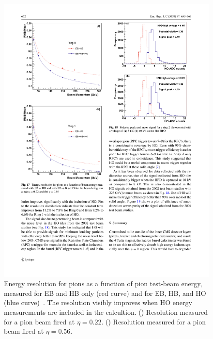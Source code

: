 \begin{figure}[hbtp]
\begin{center}
    \includegraphics[width=1.2\cmsFigWidth]{figures/cms-hcal-performance2}
    \caption{Energy resolution for pions as a function of pion test-beam energy, measured for EB and HB only (red curve) and for EB, HB, and HO (blue curve)~\cite{Baiatian:951395}. The resolution visibly improves when HO energy measurements are included in the calcultion. (\cmsLeft) Resolution measured for a pion beam fired at $\eta = 0.22$. (\cmsRight) Resolution measured for a pion beam fired at $\eta = 0.56$.}
    \label{fig:cms-hcal-performance}
  \end{center}
\end{figure}


